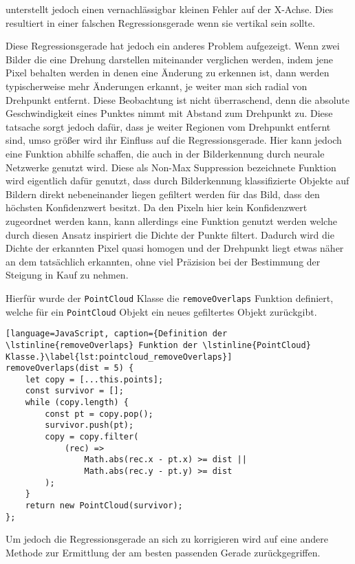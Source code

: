 unterstellt jedoch einen vernachlässigbar kleinen Fehler auf der X-Achse.
Dies resultiert in einer falschen Regressionsgerade wenn sie vertikal sein sollte.

Diese Regressionsgerade hat jedoch ein anderes Problem aufgezeigt.
Wenn zwei Bilder die eine Drehung darstellen miteinander verglichen werden, indem jene Pixel behalten werden in denen eine Änderung zu erkennen ist, dann werden typischerweise mehr Änderungen erkannt, je weiter man sich radial von Drehpunkt entfernt.
Diese Beobachtung ist nicht überraschend, denn die absolute Geschwindigkeit eines Punktes nimmt mit Abstand zum Drehpunkt zu.
Diese tatsache sorgt jedoch dafür, dass je weiter Regionen vom Drehpunkt entfernt sind, umso größer wird ihr Einfluss auf die Regressionsgerade.
Hier kann jedoch eine Funktion abhilfe schaffen, die auch in der Bilderkennung durch neurale Netzwerke genutzt wird.
Diese als Non-Max Suppression %
bezeichnete Funktion wird eigentlich dafür genutzt, dass durch Bilderkennung klassifizierte Objekte auf Bildern direkt nebeneinander liegen gefiltert werden für das Bild, dass den höchsten Konfidenzwert besitzt.
Da den Pixeln hier kein Konfidenzwert zugeordnet werden kann, kann allerdings eine Funktion genutzt werden welche durch diesen Ansatz inspiriert die Dichte der Punkte filtert.
Dadurch wird die Dichte der erkannten Pixel quasi homogen und der Drehpunkt liegt etwas näher an dem tatsächlich erkannten, ohne viel Präzision bei der Bestimmung der Steigung in Kauf zu nehmen.

Hierfür wurde der \lstinline{PointCloud} Klasse die \lstinline{removeOverlaps} Funktion definiert, welche für ein \lstinline{PointCloud} Objekt ein neues gefiltertes Objekt zurückgibt.

\begin{lstlisting}[language=JavaScript, caption={Definition der \lstinline{removeOverlaps} Funktion der \lstinline{PointCloud} Klasse.}\label{lst:pointcloud_removeOverlaps}]
removeOverlaps(dist = 5) {
    let copy = [...this.points];
    const survivor = [];
    while (copy.length) {
        const pt = copy.pop();
        survivor.push(pt);
        copy = copy.filter(
            (rec) =>
                Math.abs(rec.x - pt.x) >= dist ||
                Math.abs(rec.y - pt.y) >= dist
        );
    }
    return new PointCloud(survivor);
};
\end{lstlisting}

Um jedoch die Regressionsgerade an sich zu korrigieren wird auf eine andere Methode zur Ermittlung der am besten passenden Gerade zurückgegriffen.

